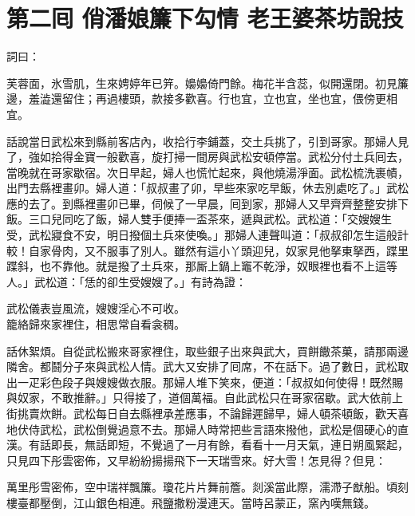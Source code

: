
\chapter*{第二囘 俏潘娘簾下勾情 老王婆茶坊說技}


詞曰：

\begin{myquote}
芙蓉面，氷雪肌，生來娉婷年已笄。嬝嬝倚門餘。梅花半含蕊，似開還閉。初見簾邊，羞澁還留住；{}再過樓頭，款接多歡喜。行也宜，立也宜，坐也宜，偎傍更相宜。

\end{myquote}

話說當日武松來到縣前客店內，收拾行李鋪蓋，交土兵挑了，引到哥家。那婦人見了，強如拾得金寶一般歡喜，{}旋打掃一間房與武松安頓停當。武松分付土兵囘去，當晚就在哥家歇宿。次日早起，婦人也慌忙起來，與他燒湯淨面。武松梳洗裹幘，出門去縣裡畫卯。婦人道：「叔叔畫了卯，早些來家吃早飯，休去別處吃了。」武松應的去了。到縣裡畫卯已畢，伺候了一早晨，囘到家，那婦人又早齊齊整整安排下飯。三口兒同吃了飯，婦人雙手便捧一盃茶來，遞與武松。武松道：「交嫂嫂生受，武松寢食不安，明日撥個土兵來使喚。」那婦人連聲叫道：「叔叔卻怎生這般計較！自家骨肉，又不服事了別人。{}{}雖然有這小丫頭迎兒，奴家見他拏東拏西，蹀里蹀斜，也不靠他。就是撥了土兵來，那厮上鍋上竈不乾淨，奴眼裡也看不上這等人。」武松道：「恁的卻生受嫂嫂了。」有詩為證：

\begin{myquote}
武松儀表豈風流，嫂嫂淫心不可收。\\
籠絡歸來家裡住，相思常自看衾稠。
\end{myquote}

話休絮煩。自從武松搬來哥家裡住，取些銀子出來與武大，買餅饊茶菓，請那兩邊隣舍。都鬪分子來與武松人情。武大又安排了囘席，不在話下。過了數日，武松取出一疋彩色段子與嫂嫂做衣服。那婦人堆下笑來，便道：「叔叔如何使得！既然賜與奴家，不敢推辭。」只得接了，道個萬福。自此武松只在哥家宿歇。武大依前上街挑賣炊餅。武松每日自去縣裡承差應事，不論歸遲歸早，婦人頓茶頓飯，歡天喜地伏侍武松，武松倒覺過意不去。那婦人時常把些言語來撥他，武松是個硬心的直漢。有話即長，無話即短，不覺過了一月有餘，看看十一月天氣，連日朔風緊起，只見四下彤雲密佈，又早紛紛揚揚飛下一天瑞雪來。好大雪！怎見得？但見：

\begin{myquote}
萬里彤雪密佈，空中瑞祥飄簾。瓊花片片舞前簷。剡溪當此際，濡滯子猷船。頃刻樓臺都壓倒，江山銀色相連。飛鹽撒粉漫連天。當時呂蒙正，窯內嘆無錢。
\end{myquote}


